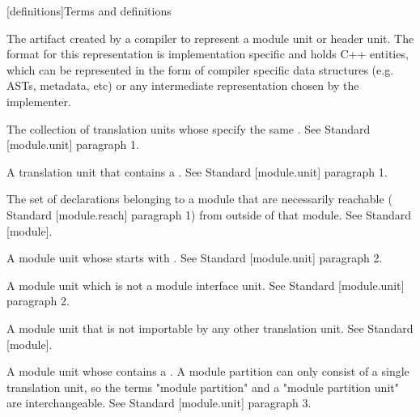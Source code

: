 
[definitions]{Terms and definitions}

%

%
The artifact created by a compiler to represent a module unit or header unit.
The format for this representation is implementation specific and holds C++
entities, which can be represented in the form of compiler specific data
structures (e.g. ASTs, metadata, etc) or any intermediate representation chosen
by the implementer.

The collection of translation units whose 
specify the same .
See \Cpp{} Standard [module.unit] paragraph 1.

A translation unit that contains a .
See \Cpp{} Standard [module.unit] paragraph 1.

The set of declarations belonging to a module that are necessarily reachable
(\Cpp{} Standard [module.reach] paragraph 1) from outside of that module.
See \Cpp{} Standard [module].

A module unit whose  starts with
.
See \Cpp{} Standard [module.unit] paragraph 2.

A module unit which is not a module interface unit.
See \Cpp{} Standard [module.unit] paragraph 2.

A module unit that is not importable by any other translation unit.
See \Cpp{} Standard [module].

A module unit whose  contains a
.
A module partition can only consist of a single translation unit, so the terms
"module partition" and a "module partition unit" are interchangeable.
See \Cpp{} Standard [module.unit] paragraph 3.

